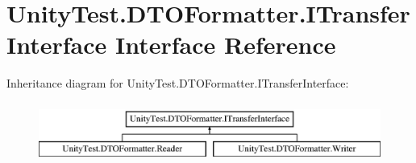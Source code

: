 \hypertarget{interface_unity_test_1_1_d_t_o_formatter_1_1_i_transfer_interface}{}\section{Unity\+Test.\+D\+T\+O\+Formatter.\+I\+Transfer\+Interface Interface Reference}
\label{interface_unity_test_1_1_d_t_o_formatter_1_1_i_transfer_interface}
Inheritance diagram for Unity\+Test.\+D\+T\+O\+Formatter.\+I\+Transfer\+Interface\+:\begin{figure}[H]
\begin{center}
\leavevmode
\includegraphics[height=2.000000cm]{interface_unity_test_1_1_d_t_o_formatter_1_1_i_transfer_interface}
\end{center}
\end{figure}
